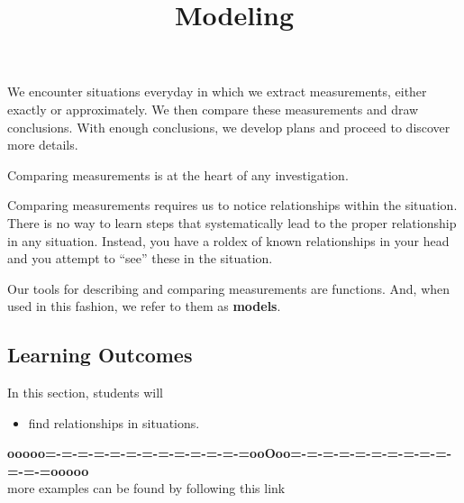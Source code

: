 \documentclass{ximera}
\title{Modeling}
\begin{document}
\begin{abstract}
\end{abstract}
\maketitle





We encounter situations everyday in which we extract measurements, either exactly or approximately. We then compare these measurements and draw conclusions.  With enough conclusions, we develop plans and proceed to discover more details.


Comparing measurements is at the heart of any investigation.

Comparing measurements requires us to notice relationships within the situation.  There is no way to learn steps that systematically lead to the proper relationship in any situation.  Instead, you have a roldex of known relationships in your head and you attempt to ``see'' these in the situation.



Our tools for describing and comparing measurements are functions.  And, when used in this fashion, we refer to them as \textbf{models}.

























\subsection{Learning Outcomes}


\begin{sectionOutcomes}
In this section, students will 

\begin{itemize}
\item find relationships in situations.
\end{itemize}
\end{sectionOutcomes}














\begin{center}
\textbf{\textcolor{green!50!black}{ooooo=-=-=-=-=-=-=-=-=-=-=-=-=ooOoo=-=-=-=-=-=-=-=-=-=-=-=-=ooooo}} \\

more examples can be found by following this link\\ 

\end{center}
\end{document}
